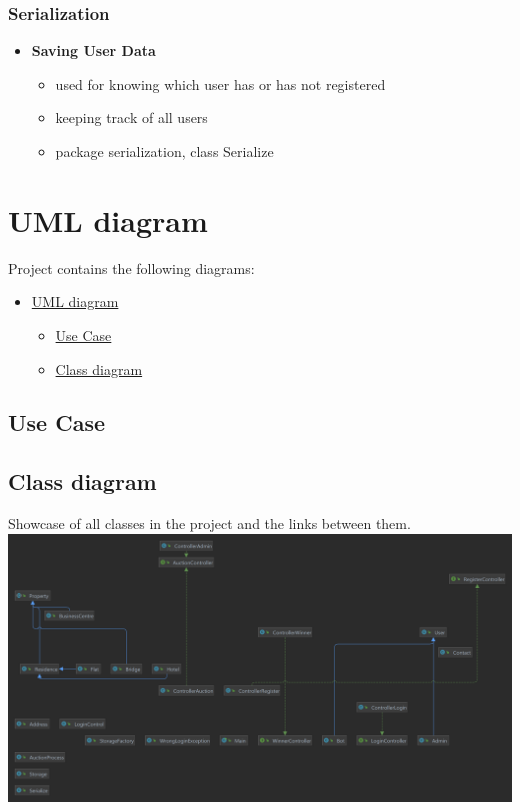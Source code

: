 \documentclass[
]{report}
\providecommand{\tightlist}{%
  \setlength{\itemsep}{0pt}\setlength{\parskip}{0pt}}
\begin{document}
\hypertarget{serialization}{%
\subsection{Serialization}\label{serialization}}

\begin{itemize}
\tightlist
\item
  \textbf{Saving User Data}

  \begin{itemize}
  \tightlist
  \item
    used for knowing which user has or has not registered
  \item
    keeping track of all users
  \item
    package serialization, class Serialize
  \end{itemize}
\end{itemize}

\hypertarget{uml-diagram}{%
\chapter{UML diagram}\label{uml-diagram}}

Project contains the following diagrams:

\begin{itemize}
\tightlist
\item
  \protect\hyperlink{uml-diagram}{UML diagram}

  \begin{itemize}
  \tightlist
  \item
    \protect\hyperlink{use-case}{Use Case}
  \item
    \protect\hyperlink{class-diagram}{Class diagram}
  \end{itemize}
\end{itemize}

\hypertarget{use-case}{%
\section{Use Case}\label{use-case}}

\hypertarget{class-diagram}{%
\section{Class diagram}\label{class-diagram}}

Showcase of all classes in the project and the links between them.
\includegraphics{diagrams/classDiagram.png}
\end{document}
